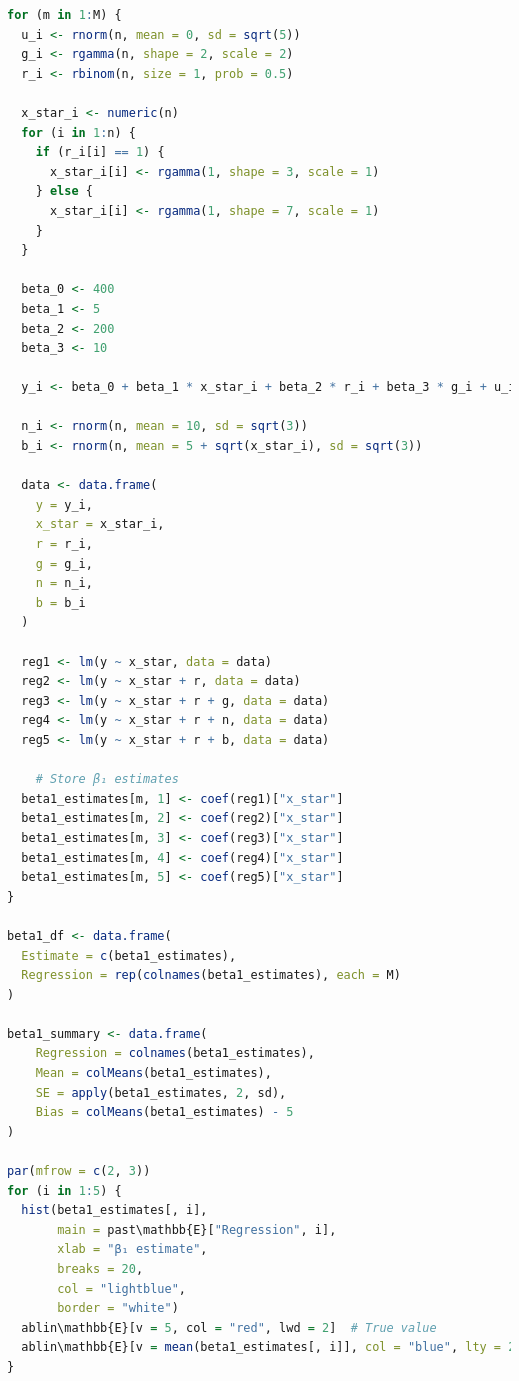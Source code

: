 \documentclass[a4paper,12pt]{article} %
\theoremstyle{nonitalic}
\newenvironment{solution}[1]
  {\renewcommand\theinnercustomsol{#1}\innercustomsol}
  {\endinnercustomsol}
\newcounter{solutionctr}
\renewcommand{\thesolutionctr}{(\alph{solutionctr})}
\newenvironment{autosolution}
  {\stepcounter{solutionctr}\begin{solution}{\thesolutionctr}}
  {\end{solution}}
\begin{document}
\begin{autosolution}
\begin{lstlisting}[language=R]
for (m in 1:M) {
  u_i <- rnorm(n, mean = 0, sd = sqrt(5))
  g_i <- rgamma(n, shape = 2, scale = 2)
  r_i <- rbinom(n, size = 1, prob = 0.5)
    
  x_star_i <- numeric(n)
  for (i in 1:n) {
    if (r_i[i] == 1) {
      x_star_i[i] <- rgamma(1, shape = 3, scale = 1)
    } else {
      x_star_i[i] <- rgamma(1, shape = 7, scale = 1)
    }
  }
    
  beta_0 <- 400
  beta_1 <- 5
  beta_2 <- 200
  beta_3 <- 10
    
  y_i <- beta_0 + beta_1 * x_star_i + beta_2 * r_i + beta_3 * g_i + u_i
    
  n_i <- rnorm(n, mean = 10, sd = sqrt(3))
  b_i <- rnorm(n, mean = 5 + sqrt(x_star_i), sd = sqrt(3))
    
  data <- data.frame(
    y = y_i,
    x_star = x_star_i,
    r = r_i,
    g = g_i,
    n = n_i,
    b = b_i
  )
  
  reg1 <- lm(y ~ x_star, data = data)
  reg2 <- lm(y ~ x_star + r, data = data)
  reg3 <- lm(y ~ x_star + r + g, data = data)
  reg4 <- lm(y ~ x_star + r + n, data = data)
  reg5 <- lm(y ~ x_star + r + b, data = data)
    
    # Store β₁ estimates
  beta1_estimates[m, 1] <- coef(reg1)["x_star"]
  beta1_estimates[m, 2] <- coef(reg2)["x_star"]
  beta1_estimates[m, 3] <- coef(reg3)["x_star"]
  beta1_estimates[m, 4] <- coef(reg4)["x_star"]
  beta1_estimates[m, 5] <- coef(reg5)["x_star"]
}

beta1_df <- data.frame(
  Estimate = c(beta1_estimates),
  Regression = rep(colnames(beta1_estimates), each = M)
)

beta1_summary <- data.frame(
    Regression = colnames(beta1_estimates),
    Mean = colMeans(beta1_estimates),
    SE = apply(beta1_estimates, 2, sd),
    Bias = colMeans(beta1_estimates) - 5
)

par(mfrow = c(2, 3))
for (i in 1:5) {
  hist(beta1_estimates[, i], 
       main = past\mathbb{E}["Regression", i], 
       xlab = "β₁ estimate",
       breaks = 20,
       col = "lightblue",
       border = "white")
  ablin\mathbb{E}[v = 5, col = "red", lwd = 2]  # True value
  ablin\mathbb{E}[v = mean(beta1_estimates[, i]], col = "blue", lty = 2, lwd = 2)  # Mean estimate
}
\end{lstlisting}

\end{autosolution}
\end{document}

